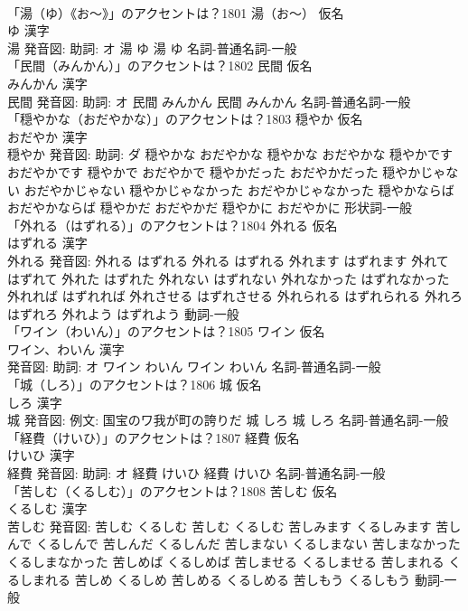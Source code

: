 \documentclass[8pt]{extreport}
\begin{document}
\begin{CJK}{UTF8}{min}
\\	「湯（ゆ）《お〜》」のアクセントは？1801	湯（お〜） 仮名　
\\	ゆ 漢字　
\\	湯 発音図: 助詞: オ	湯 ゆ		湯 ゆ				名詞-普通名詞-一般 
\\	「民間（みんかん）」のアクセントは？1802	民間 仮名　
\\	みんかん 漢字　
\\	民間 発音図: 助詞: オ	民間 みんかん		民間 みんかん				名詞-普通名詞-一般 
\\	「穏やかな（おだやかな）」のアクセントは？1803	穏やか 仮名　
\\	おだやか 漢字　
\\	穏やか 発音図: 助詞: ダ	穏やかな おだやかな		穏やかな おだやかな 穏やかです おだやかです 穏やかで おだやかで 穏やかだった おだやかだった 穏やかじゃない おだやかじゃない 穏やかじゃなかった おだやかじゃなかった 穏やかならば おだやかならば 穏やかだ おだやかだ 穏やかに おだやかに				形状詞-一般 
\\	「外れる（はずれる）」のアクセントは？1804	外れる 仮名　
\\	はずれる 漢字　
\\	外れる 発音図:	外れる はずれる		外れる はずれる 外れます はずれます 外れて はずれて 外れた はずれた 外れない はずれない 外れなかった はずれなかった 外れれば はずれれば 外れさせる はずれさせる 外れられる はずれられる 外れろ はずれろ 外れよう はずれよう				動詞-一般 
\\	「ワイン（わいん）」のアクセントは？1805	ワイン 仮名　
\\	ワイン、わいん 漢字　
\\	発音図: 助詞: オ	ワイン わいん		ワイン わいん				名詞-普通名詞-一般 
\\	「城（しろ）」のアクセントは？1806	城 仮名　
\\	しろ 漢字　
\\	城 発音図: 例文: 国宝のワ我が町の誇りだ	城 しろ		城 しろ				名詞-普通名詞-一般 
\\	「経費（けいひ）」のアクセントは？1807	経費 仮名　
\\	けいひ 漢字　
\\	経費 発音図: 助詞: オ	経費 けいひ		経費 けいひ				名詞-普通名詞-一般 
\\	「苦しむ（くるしむ）」のアクセントは？1808	苦しむ 仮名　
\\	くるしむ 漢字　
\\	苦しむ 発音図:	苦しむ くるしむ		苦しむ くるしむ 苦しみます くるしみます 苦しんで くるしんで 苦しんだ くるしんだ 苦しまない くるしまない 苦しまなかった くるしまなかった 苦しめば くるしめば 苦しませる くるしませる 苦しまれる くるしまれる 苦しめ くるしめ 苦しめる くるしめる 苦しもう くるしもう				動詞-一般 

\end{CJK}
\end{document}
